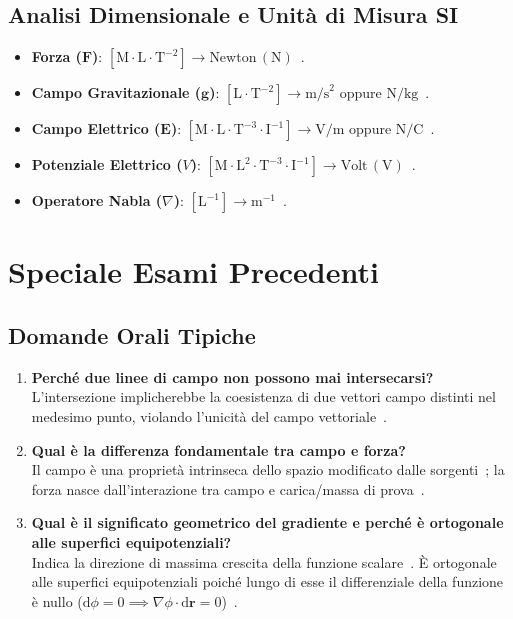 \documentclass[12pt, a4paper]{article}
\begin{document}
\subsection{Analisi Dimensionale e Unità di Misura SI}
\begin{itemize}
    \item \textbf{Forza ($\mathbf{F}$)}: $[\text{M} \cdot \text{L} \cdot \text{T}^{-2}] \longrightarrow \text{Newton} \, (\text{N})$~\cite{3}.
    \item \textbf{Campo Gravitazionale ($\mathbf{g}$)}: $[\text{L} \cdot \text{T}^{-2}] \longrightarrow \text{m/s}^2$ oppure $\text{N/kg}$~\cite{2}.
    \item \textbf{Campo Elettrico ($\mathbf{E}$)}: $[\text{M} \cdot \text{L} \cdot \text{T}^{-3} \cdot \text{I}^{-1}] \longrightarrow \text{V/m}$ oppure $\text{N/C}$~\cite{2}.
    \item \textbf{Potenziale Elettrico ($V$)}: $[\text{M} \cdot \text{L}^2 \cdot \text{T}^{-3} \cdot \text{I}^{-1}] \longrightarrow \text{Volt} \, (\text{V})$~\cite{2}.
    \item \textbf{Operatore Nabla ($\nabla$)}: $[\text{L}^{-1}] \longrightarrow \text{m}^{-1}$~\cite{2}.
\end{itemize}

\section{Speciale Esami Precedenti}

\subsection{Domande Orali Tipiche}
\begin{enumerate}
    \item \textbf{Perché due linee di campo non possono mai intersecarsi?} \\
    L'intersezione implicherebbe la coesistenza di due vettori campo distinti nel medesimo punto, violando l'unicità del campo vettoriale~\cite{1, 2}.
    \item \textbf{Qual è la differenza fondamentale tra campo e forza?} \\
    Il campo è una proprietà intrinseca dello spazio modificato dalle sorgenti~\cite{1, 2}; la forza nasce dall'interazione tra campo e carica/massa di prova~\cite{1}.
    \item \textbf{Qual è il significato geometrico del gradiente e perché è ortogonale alle superfici equipotenziali?} \\
    Indica la direzione di massima crescita della funzione scalare~\cite{2}. È ortogonale alle superfici equipotenziali poiché lungo di esse il differenziale della funzione è nullo ($\text{d}\phi = 0 \implies \nabla \phi \cdot \text{d}\mathbf{r} = 0$)~\cite{2}.
\end{enumerate}
\end{document}
